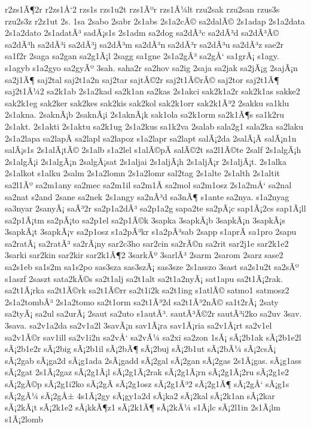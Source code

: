 {r2zs1Ã¶2r
r2zs1Å‘2
rzs1s
rzs1u2t
rzs1Ãºr
rzs1Ã¼lt
rzu2sak
rzu2san
rzus3s
rzu2s3z
r2z1ut
2s.
1sa
2sabo
2sabr
2s1abs
2s1a2cÃ©
sa2dalÃ©
2s1adap
2s1a2data
2s1a2dato
2s1adatÃ³
sadÃ¡s1s
2s1adm
sa2dog
sa2dÃ³c
sa2dÃ³d
sa2dÃ³Ã©
sa2dÃ³h
sa2dÃ³i
sa2dÃ³j
sa2dÃ³m
sa2dÃ³n
sa2dÃ³r
sa2dÃ³u
sa2dÃ³z
sae2r
sa1f2r
2saga
sa2gan
sa2g1Ã¡l
2sagg
sa1gne
2s1a2gÃ³
sa2gÅ‘
sa1grÃ¡
s1agy.
s1agyb
s1a2gyo
sa2gyÃº
3sah.
saha2r
sa2hov
sa2ig
2saja
sa2jak
sa2jÃ¡g
2sajÃ¡n
sa2j1Ã¶
saj2tal
saj2t1a2n
saj2tar
sajtÃ©2r
saj2t1Ã©rÃ©
saj2tor
saj2t1Ã¶
saj2t1Ã¼2
sa2k1ab
2s1a2kad
sa2k1an
sa2kas
2s1akci
sak2k1a2r
sak2k1as
sakke2
sak2k1eg
sak2ker
sak2kes
sak2kis
sak2kol
sak2k1orr
sak2k1Ã³2
2sakku
sa1klu
2s1akna.
2saknÃ¡b
2saknÃ¡i
2s1aknÃ¡k
sak1ola
sa2k1orm
sa2k1Ã¶s
sa1k2ru
2s1akt.
2s1akti
2s1aktu
sa2k1ug
2s1a2kus
sa1k2va
2salab
sala2g1
sala2ka
sa2laku
2s1a2lapa
sa2lapÃ­
sa2lapl
sa2lapoz
s1a2lapr
sa2lapt
salÃ¡2da
2salÃ¡Ã­
salÃ¡n1n
salÃ¡s1s
2s1alÃ¡tÃ©
2s1alb
s1a2lel
s1alÃ©pÃ­
salÃ©2t
sa2l1Ã©te
2salf
2s1algÃ¡h
2s1algÃ¡i
2s1algÃ¡n
2salgÃ¡sat
2s1aljai
2s1aljÃ¡h
2s1aljÃ¡r
2s1aljÃ¡t.
2s1alka
2s1alkot
s1alku
2salm
2s1a2lomn
2s1a2lomr
sal2tag
2s1alte
2s1alth
2s1altit
sa2l1Ãº
sa2m1any
sa2mec
sa2m1il
sa2m1Ã­
sa2mol
sa2m1osz
2s1a2mÅ‘
sa2nal
sa2nat
s2and
2sane
sa2nek
2s1angy
sa2nÃ³d
sa3nÃ¶
s1ante
sa2nya.
s1a2nyag
sa3nyar
2sanyÃ¡
saÃ³2r
sa2p1a2dÃ³
sa2p1a2g
sapa2te
sa2pÃ¡c
sap1Ã¡2cs
sap1Ã¡ll
sa2p1Ã¡tm
sa2pÃ¡to
sa2p1el
sa2p1Ã©k
3sapka
3sapkÃ¡b
3sapkÃ¡n
3sapkÃ¡s
3sapkÃ¡t
3sapkÃ¡v
sa2p1osz
s1a2pÃ³kr
s1a2pÃ³sab
2sapp
s1aprÃ­
sa1pro
2sapu
sa2ratÃ¡
sa2ratÃ³
sa2rÃ¡ny
sar2c3ho
sar2cin
sa2rÃ©n
sa2rit
sar2j1e
sar2k1e2
3sarki
sar2kin
sar2kir
sar2k1Ã¶2
3sarkÃº
3sarlÃ³
2sarm
2sarom
2sarz
sase2
sa2s1eb
sa1s2m
sa1s2po
sas3sza
sas3szÃ¡
sas3sze
2s1asszo
3sast
sa2s1u2t
sa2sÃº
s1aszf
2saszt
sata2kÃ©s
sa2t1alj
sa2t1alt
sa2t1a2nyÃ¡
sat1apu
sa2t1Ã¡2rak.
sa2t1Ã¡rka
sa2t1Ã©rk
sa2t1Ã©rr
sa2t1i2k
sa2t1ing
s1atlÃ©
satmo1
satmosz2
2s1a2tombÃ³
2s1a2tomo
sa2t1orm
sa2t1Ã³2d
sa2t1Ã³2nÃ©
sa1t2rÃ¡
2saty
sa2tyÃ¡
sa2ul
sa2urÃ¡
2saut
sa2uto
s1autÃ³.
sautÃ³Ã©2r
sautÃ³i2ko
sa2uv
3sav.
3sava.
sa2v1a2da
sa2v1a2l
3savÃ¡n
sav1Ã¡ra
sav1Ã¡ria
sa2v1Ã¡rt
sa2v1el
sa2v1Ã©r
sav1ill
sa2v1i2n
sa2vÅ‘
sa2vÃ¼
sa2xi
sa2zon
1sÃ¡
sÃ¡2b1ak
sÃ¡2b1e2l
sÃ¡2b1e2r
sÃ¡2big
sÃ¡2b1il
sÃ¡2bÃ¶
sÃ¡2buj
sÃ¡2b1ut
sÃ¡2bÃ¼
sÃ¡2csÃ¡
sÃ¡2gab
sÃ¡ga2d
sÃ¡g1ada
2sÃ¡gadd
sÃ¡2gal
sÃ¡2gan
sÃ¡2gas
2s1Ã¡gas.
sÃ¡g1ass
sÃ¡2gat
2s1Ã¡2gaz
sÃ¡2g1Ã¡l
sÃ¡2g1Ã¡2rak
sÃ¡2g1Ã¡rn
sÃ¡2g1Ã¡2ru
sÃ¡2g1e2
sÃ¡2gÃ©p
sÃ¡2g1i2ko
sÃ¡2gÃ­
sÃ¡2g1osz
sÃ¡2g1Ã³2
sÃ¡2g1Ã¶
sÃ¡2gÅ‘
sÃ¡g1s
sÃ¡2gÃ¼
sÃ¡2gÅ±
4s1Ã¡2gy
sÃ¡gy1a2d
sÃ¡ka2
sÃ¡2kal
sÃ¡2k1an
sÃ¡2kar
sÃ¡2kÃ¡t
sÃ¡2k1e2
sÃ¡kkÃ¶z1
sÃ¡2k1Ã¶
sÃ¡2kÃ¼
s1Ã¡lc
sÃ¡2l1in
2s1Ã¡lm
s1Ã¡2lomb
}
